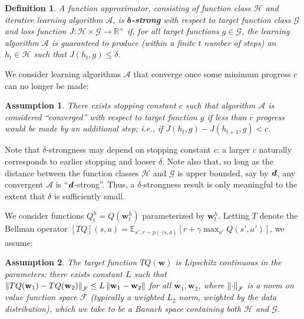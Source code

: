 \documentclass[letterpaper]{article} %
\newcommand{\R}{\mathbb{R}}
\renewcommand{\vec}[1]{\textbf{\textit{#1}}}
\newcommand{\val}{Q}
\newcommand{\valt}{\val}
\newcommand{\params}{\mathbf{w}}
\newcommand{\bellmanop}{T}
\newcommand{\smashednorm}[1]{\left\lVert \smash{#1} \right\rVert}
\newtheorem{definition}{Definition}
\newtheorem{assumption}{Assumption}
\begin{document}
\begin{definition}\label{defition_delta_strongness}
    A function approximator, consisting of function class $\mathcal{H}$ and iterative learning algorithm $\mathcal{A}$, is \textbf{$\bm{\delta}$-strong} with respect to target function class $\mathcal{G}$ and loss function $J: \mathcal{H} \times \mathcal{G} \to \R^+$ if, for all target functions $g \in \mathcal{G}$, the learning algorithm $\mathcal{A}$ is \textit{guaranteed} to produce (within a finite $t$ number of steps) an $h_t \in \mathcal{H}$ such that $J(h_t, g) \leq \delta$.
\end{definition}

We consider learning algorithms $\mathcal{A}$ that converge once some minimum progress $c$ can no longer be made:

\begin{assumption}\label{assumption_minimum_progress}
    There exists stopping constant $c$ such that algorithm $\mathcal{A}$ is considered ``converged'' with respect to target function $g$ if less than $c$ progress would be made by an additional step; i.e., if $J(h_{t}, g) - J(h_{t+1}, g) < c$.
\end{assumption}

Note that $\delta$-strongness may depend on stopping constant $c$: a larger $c$ naturally corresponds to earlier stopping and looser $\delta$. Note also that, so long as the distance between the function classes $\mathcal{H}$ and $\mathcal{G}$ is upper bounded, say by $\vec{d}$, any convergent $\mathcal{A}$ is ``$\vec{d}$-strong''. Thus, a $\delta$-strongness result is only meaningful to the extent that $\delta$ is sufficiently small.

We consider functions $\valt^h_t = \valt(\params^{h}_t)$ parameterized by $\params^{h}_t$. Letting $\bellmanop$ denote the Bellman operator $[\bellmanop\valt](s, a) = \mathbb{E}_{s',r \sim p(\cdot|s,a)}[r + \gamma \max_{a'}\valt(s',a')]$, we assume:

\begin{assumption}
    \label{assumption_Lipschitz}
        The target function $\bellmanop\valt(\params)$ is Lipschitz continuous in the parameters: there exists constant $L$ such that $\smashednorm{\bellmanop\valt(\params_1) - \bellmanop\valt(\params_2)}_\mathcal{F}\leq L\smashednorm{\params_1 - \params_2}$ for all $\params_1, \params_2$, where $\smashednorm{\cdot}_\mathcal{F}$ is a norm on value function space $\mathcal{F}$ (typically a weighted $L_2$ norm, weighted by the data distribution), which we take to be a Banach space containing both $\mathcal{H}$ and $\mathcal{G}$.
\end{assumption}
\end{document}
